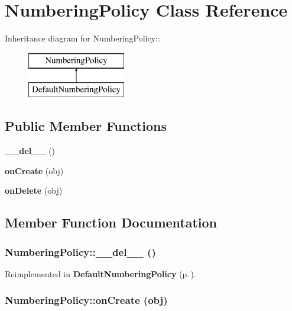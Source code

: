 \section{Numbering\-Policy Class Reference}
\label{classNumberingPolicy}
Inheritance diagram for Numbering\-Policy::\begin{figure}[H]
\begin{center}
\leavevmode
\includegraphics[height=2cm]{classNumberingPolicy}
\end{center}
\end{figure}
\subsection*{Public Member Functions}
\begin{CompactItemize}
\item 
{\bf \_\-\_\-del\_\-\_\-} ()
\item 
{\bf on\-Create} (obj)
\item 
{\bf on\-Delete} (obj)
\end{CompactItemize}


\subsection{Member Function Documentation}
\subsubsection{\setlength{\rightskip}{0pt plus 5cm}Numbering\-Policy::\_\-\_\-del\_\-\_\- ()}\label{classNumberingPolicy_NumberingPolicya0}




Reimplemented in {\bf Default\-Numbering\-Policy} {\rm (p.\,\pageref{classDefaultNumberingPolicy_DefaultNumberingPolicya0})}.
\subsubsection{\setlength{\rightskip}{0pt plus 5cm}Numbering\-Policy::on\-Create (obj)}\label{classNumberingPolicy_NumberingPolicya1}




